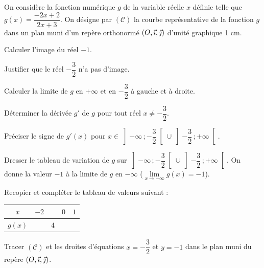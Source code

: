 \documentclass[11pt]{article}
\begin{document}
On considère la fonction numérique $g$ de la variable réelle $x$ définie telle que $g(x) = \dfrac{-2x + 2}{2x + 3}$. On désigne par $(\mathcal{C})$ la courbe représentative de la fonction $g$ dans un plan muni d'un repère orthonormé $(O,\vec{\imath},\vec{\jmath})$ d'unité graphique 1 cm.
\begin{questions}
  \item \begin{sousq}
    \item Calculer l'image du réel $-1$.
    \item Justifier que le réel $-\dfrac{3}{2}$ n'a pas d'image.
  \end{sousq}
  \item Calculer la limite de $g$ en $+\infty$ et en $-\dfrac{3}{2}$ à gauche et à droite.
  \item \begin{sousq}
    \item Déterminer la dérivée $g'$ de $g$ pour tout réel $x \ne -\dfrac{3}{2}$.
    \item Préciser le signe de $g'(x)$ pour $x \in \left]-\infty\,;-\dfrac{3}{2}\right[ \cup \left]-\dfrac{3}{2}\,;+\infty\right[$.
  \end{sousq}
  \item Dresser le tableau de variation de $g$ sur $\left]-\infty\,;-\dfrac{3}{2}\right[ \cup \left]-\dfrac{3}{2}\,;+\infty\right[$. On donne la valeur $-1$ à la limite de $g$ en $-\infty$ ($\lim\limits_{x\to-\infty} g(x) = -1$).
  \item Recopier et compléter le tableau de valeurs suivant :
  \begin{center}\renewcommand{\arraystretch}{1.5}
  \begin{tabular}{|c|c|c|c|c|}
  \hline
  $x$ & $-2$ & & $0$ & $1$ \\
  \hline
  $g(x)$ & & $4$ & & \\
  \hline
  \end{tabular}
  \end{center}
  \item Tracer $(\mathcal{C})$ et les droites d'équations $x = -\dfrac{3}{2}$ et $y = -1$ dans le plan muni du repère $(O,\vec{\imath},\vec{\jmath})$.
\end{questions}
\end{document}
